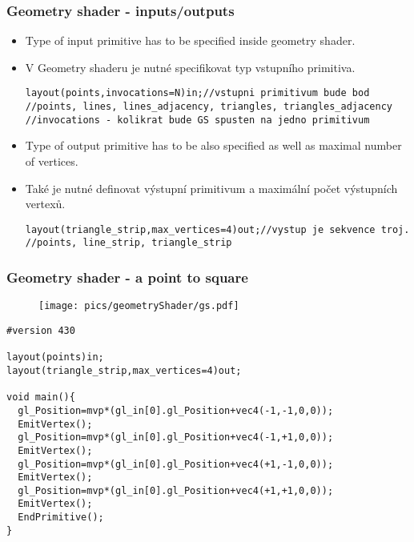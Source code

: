 \begin{frame}[fragile]
\frametitle{Geometry shader - inputs/outputs}
  \scriptsize
	\begin{itemize}
  \item Type of input primitive has to be specified inside geometry shader.
	\item V Geometry shaderu je nutné specifikovat typ vstupního primitiva.
	{\scriptsize
\begin{verbatim}
layout(points,invocations=N)in;//vstupni primitivum bude bod
//points, lines, lines_adjacency, triangles, triangles_adjacency
//invocations - kolikrat bude GS spusten na jedno primitivum
	\end{verbatim}
	}
	\item Type of output primitive has to be also specified as well as maximal number of vertices.
	\item Také je nutné definovat výstupní primitivum a maximální počet výstupních vertexů.
	{\scriptsize
\begin{verbatim}
layout(triangle_strip,max_vertices=4)out;//vystup je sekvence troj.
//points, line_strip, triangle_strip
	\end{verbatim}
	}
	\end{itemize}
\end{frame}

\begin{frame}[fragile]
\frametitle{Geometry shader - a point to square}
	\begin{figure}[h]
		\texttt{[image: pics/geometryShader/gs.pdf]}
	\end{figure}
  \scriptsize

	{\scriptsize
\begin{verbatim}
#version 430

layout(points)in;
layout(triangle_strip,max_vertices=4)out;

void main(){
  gl_Position=mvp*(gl_in[0].gl_Position+vec4(-1,-1,0,0));
  EmitVertex();
  gl_Position=mvp*(gl_in[0].gl_Position+vec4(-1,+1,0,0));
  EmitVertex();
  gl_Position=mvp*(gl_in[0].gl_Position+vec4(+1,-1,0,0));
  EmitVertex();
  gl_Position=mvp*(gl_in[0].gl_Position+vec4(+1,+1,0,0));
  EmitVertex();
  EndPrimitive();
}
	\end{verbatim}
	}
\end{frame}

